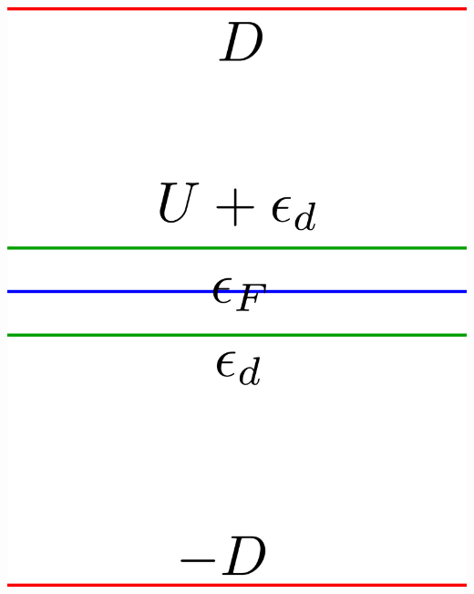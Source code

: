 \documentclass[twoside]{report}
\numberwithin{equation}{section}
\begin{document}
\begin{minipage}{0.3\textwidth}
    \centering
    \includegraphics[width=\textwidth]{../figures/anderson2.png}
    \label{and2}
\end{minipage}
\end{document}
